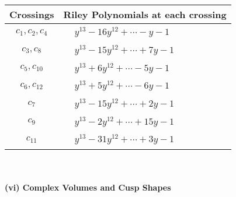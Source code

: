 \documentclass[1p]{elsarticle_modified}
\theoremstyle{definition}
\begin{document}
\begin{tabular}{m{50pt}|m{274pt}}
Crossings & \hspace{64pt}Riley Polynomials at each crossing \\
\hline $$\begin{aligned}c_{1},c_{2},c_{4}\end{aligned}$$&$\begin{aligned}
&y^{13}-16 y^{12}+\cdots- y-1
\end{aligned}$\\
\hline $$\begin{aligned}c_{3},c_{8}\end{aligned}$$&$\begin{aligned}
&y^{13}-15 y^{12}+\cdots+7 y-1
\end{aligned}$\\
\hline $$\begin{aligned}c_{5},c_{10}\end{aligned}$$&$\begin{aligned}
&y^{13}+6 y^{12}+\cdots-5 y-1
\end{aligned}$\\
\hline $$\begin{aligned}c_{6},c_{12}\end{aligned}$$&$\begin{aligned}
&y^{13}+5 y^{12}+\cdots-6 y-1
\end{aligned}$\\
\hline $$\begin{aligned}c_{7}\end{aligned}$$&$\begin{aligned}
&y^{13}-15 y^{12}+\cdots+2 y-1
\end{aligned}$\\
\hline $$\begin{aligned}c_{9}\end{aligned}$$&$\begin{aligned}
&y^{13}-2 y^{12}+\cdots+15 y-1
\end{aligned}$\\
\hline $$\begin{aligned}c_{11}\end{aligned}$$&$\begin{aligned}
&y^{13}-31 y^{12}+\cdots+3 y-1
\end{aligned}$\\
\hline
\end{tabular}\\~\\
\newpage\flushleft \textbf{(vi) Complex Volumes and Cusp Shapes}
\end{document}
